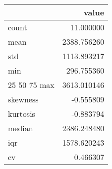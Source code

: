 \begin{tabular}{lr}
\toprule
 & value \\
\midrule
count & 11.000000 \\
mean & 2388.756260 \\
std & 1113.893217 \\
min & 296.755360 \\
25%
50%
75%
max & 3613.010146 \\
skewness & -0.555809 \\
kurtosis & -0.883794 \\
median & 2386.248480 \\
iqr & 1578.620243 \\
cv & 0.466307 \\
\bottomrule
\end{tabular}
